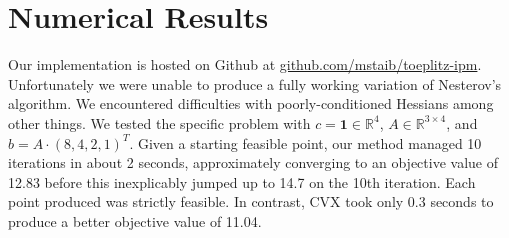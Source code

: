 \documentclass{article}
\begin{document}
\section{Numerical Results}
Our implementation is hosted on Github at \url{github.com/mstaib/toeplitz-ipm}.
Unfortunately we were unable to produce a fully working variation of Nesterov's
algorithm. We encountered difficulties with poorly-conditioned Hessians among
other things. We tested the specific problem with $c = \mathbf 1 \in \mathbb
R^4$, $A \in \mathbb R^{3\times 4}$, and $b = A \cdot (8,4,2,1)^T$. Given a
starting feasible point, our method managed 10 iterations in about 2 seconds,
approximately converging to an objective value of 12.83 before this
inexplicably jumped up to 14.7 on the 10th iteration. Each point produced was
strictly feasible. In contrast, CVX took only 0.3 seconds to produce a better
objective value of 11.04.

\newpage

\end{document}
